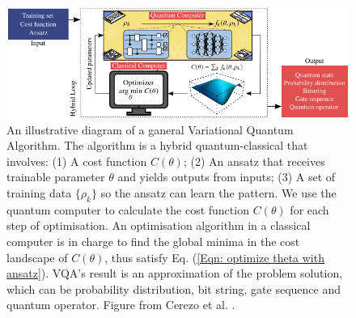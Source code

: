 

\begin{figure}
    \centering
    \includegraphics[width=\linewidth]{Appendices/vqadiagram.png}
    \caption{
        An illustrative diagram of a ganeral Variational Quantum Algorithm.
        The algorithm is a hybrid quantum-classical that involves:
        (1) A cost function $C(\theta)$;
        (2) An ansatz that receives trainable parameter $\theta$ and yields outputs from inputs;
        (3) A set of training data $\{\rho_k\}$ so the ansatz can learn the pattern.
        We use the quantum computer to calculate the cost function $C(\theta)$ for each step of optimisation.
        An optimisation algorithm in a classical computer is in charge to find the global minima in the cost landscape of $C(\theta)$, thus satisfy Eq. (\ref{Eqn: optimize theta with ansatz}).
        VQA's result is an approximation of the problem solution, which can be probability distribution, bit string, gate sequence and quantum operator.
        Figure from Cerezo et al. \cite{cerezo_variational_2021}.
    }
    \label{Fig: VQA diagram}
\end{figure}






% 
